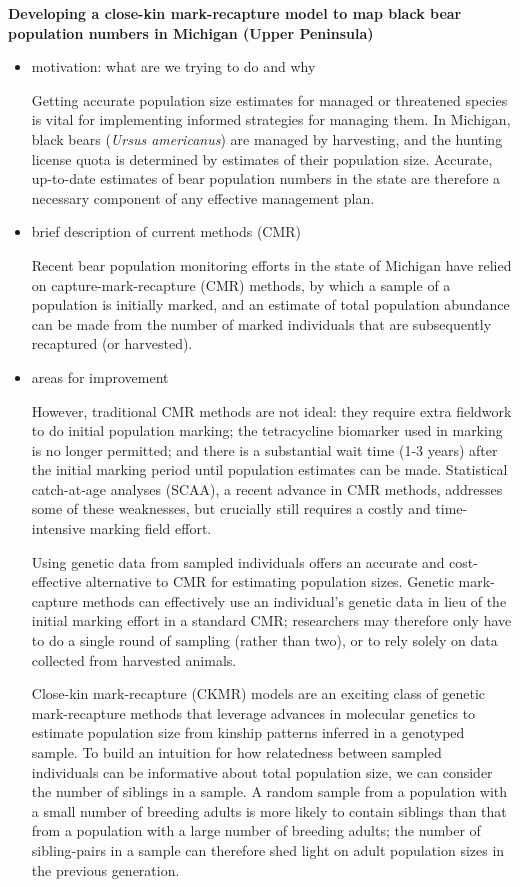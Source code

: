 \documentclass[12pt]{article}
\begin{document}
%
\begin{center}
\textbf{Developing a close-kin mark-recapture model to map black bear population numbers in Michigan (Upper Peninsula)}
\end{center}
%            
\begin{itemize}
\item motivation: what are we trying to do and why

Getting accurate population size estimates 
for managed or threatened species  
is vital for implementing informed strategies for managing them.
In Michigan, black bears (\textit{Ursus americanus}) 
are managed by harvesting, 
and the hunting license quota is determined by 
estimates of their population size.
Accurate, up-to-date estimates of 
bear population numbers in the state 
are therefore a necessary component 
of any effective management plan.

\item brief description of current methods (CMR)

Recent bear population monitoring efforts 
in the state of Michigan have relied on 
capture-mark-recapture (CMR) methods, 
by which a sample of a population is initially marked, 
and an estimate of total population abundance 
can be made from the number of marked individuals 
that are subsequently recaptured (or harvested). 

\item areas for improvement

However, traditional CMR methods are not ideal:  
they require extra fieldwork to do initial population marking; 
the tetracycline biomarker used in marking is no longer permitted; 
and there is a substantial wait time (1-3 years) after the 
initial marking period until population estimates can be made.
Statistical catch-at-age analyses (SCAA), 
a recent advance in CMR methods, 
addresses some of these weaknesses, 
but crucially still requires a costly and time-intensive 
marking field effort.

Using genetic data from sampled individuals 
offers an accurate and cost-effective alternative to CMR 
for estimating population sizes. 
Genetic mark-capture methods can effectively use 
an individual's genetic data in lieu of 
the initial marking effort in a standard CMR; 
researchers may therefore 
only have to do a single round of sampling 
(rather than two), 
or to rely solely on data collected from harvested animals.

Close-kin mark-recapture (CKMR) models 
are an exciting class of genetic mark-recapture methods 
that leverage advances in molecular genetics 
to estimate population size 
from kinship patterns inferred in a genotyped sample.
To build an intuition for how relatedness 
between sampled individuals can be informative 
about total population size, 
we can consider the number of siblings in a sample.
A random sample from a population 
with a small number of breeding adults 
is more likely to contain siblings than that 
from a population with a large number of breeding adults; 
the number of sibling-pairs in a sample can 
therefore shed light on adult population sizes 
in the previous generation.


\end{itemize}
\end{document}
